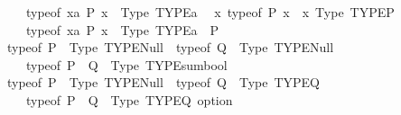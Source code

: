 \begin{isabellebody}
\ \ \ \ \ typeof\ {\isacharparenleft}{\kern0pt}{\isasymexists}x{\isacharcolon}{\kern0pt}{\isacharcolon}{\kern0pt}{\isacharprime}{\kern0pt}a{\isachardot}{\kern0pt}\ P\ x{\isacharparenright}{\kern0pt}\ {\isasymequiv}\ Type\ {\isacharparenleft}{\kern0pt}TYPE{\isacharparenleft}{\kern0pt}{\isacharprime}{\kern0pt}a{\isacharparenright}{\kern0pt}{\isacharparenright}{\kern0pt}{\isachardoublequoteclose}\isanewline
\isanewline
\ \ {\isachardoublequoteopen}{\isacharparenleft}{\kern0pt}{\isasymlambda}x{\isachardot}{\kern0pt}\ typeof\ {\isacharparenleft}{\kern0pt}P\ x{\isacharparenright}{\kern0pt}{\isacharparenright}{\kern0pt}\ {\isasymequiv}\ {\isacharparenleft}{\kern0pt}{\isasymlambda}x{\isachardot}{\kern0pt}\ Type\ {\isacharparenleft}{\kern0pt}TYPE{\isacharparenleft}{\kern0pt}{\isacharprime}{\kern0pt}P{\isacharparenright}{\kern0pt}{\isacharparenright}{\kern0pt}{\isacharparenright}{\kern0pt}\ {\isasymLongrightarrow}\isanewline
\ \ \ \ \ typeof\ {\isacharparenleft}{\kern0pt}{\isasymexists}x{\isacharcolon}{\kern0pt}{\isacharcolon}{\kern0pt}{\isacharprime}{\kern0pt}a{\isachardot}{\kern0pt}\ P\ x{\isacharparenright}{\kern0pt}\ {\isasymequiv}\ Type\ {\isacharparenleft}{\kern0pt}TYPE{\isacharparenleft}{\kern0pt}{\isacharprime}{\kern0pt}a\ {\isasymtimes}\ {\isacharprime}{\kern0pt}P{\isacharparenright}{\kern0pt}{\isacharparenright}{\kern0pt}{\isachardoublequoteclose}\isanewline
\isanewline
\ \ {\isachardoublequoteopen}typeof\ P\ {\isasymequiv}\ Type\ {\isacharparenleft}{\kern0pt}TYPE{\isacharparenleft}{\kern0pt}Null{\isacharparenright}{\kern0pt}{\isacharparenright}{\kern0pt}\ {\isasymLongrightarrow}\ typeof\ Q\ {\isasymequiv}\ Type\ {\isacharparenleft}{\kern0pt}TYPE{\isacharparenleft}{\kern0pt}Null{\isacharparenright}{\kern0pt}{\isacharparenright}{\kern0pt}\ {\isasymLongrightarrow}\isanewline
\ \ \ \ \ typeof\ {\isacharparenleft}{\kern0pt}P\ {\isasymor}\ Q{\isacharparenright}{\kern0pt}\ {\isasymequiv}\ Type\ {\isacharparenleft}{\kern0pt}TYPE{\isacharparenleft}{\kern0pt}sumbool{\isacharparenright}{\kern0pt}{\isacharparenright}{\kern0pt}{\isachardoublequoteclose}\isanewline
\isanewline
\ \ {\isachardoublequoteopen}typeof\ P\ {\isasymequiv}\ Type\ {\isacharparenleft}{\kern0pt}TYPE{\isacharparenleft}{\kern0pt}Null{\isacharparenright}{\kern0pt}{\isacharparenright}{\kern0pt}\ {\isasymLongrightarrow}\ typeof\ Q\ {\isasymequiv}\ Type\ {\isacharparenleft}{\kern0pt}TYPE{\isacharparenleft}{\kern0pt}{\isacharprime}{\kern0pt}Q{\isacharparenright}{\kern0pt}{\isacharparenright}{\kern0pt}\ {\isasymLongrightarrow}\isanewline
\ \ \ \ \ typeof\ {\isacharparenleft}{\kern0pt}P\ {\isasymor}\ Q{\isacharparenright}{\kern0pt}\ {\isasymequiv}\ Type\ {\isacharparenleft}{\kern0pt}TYPE{\isacharparenleft}{\kern0pt}{\isacharprime}{\kern0pt}Q\ option{\isacharparenright}{\kern0pt}{\isacharparenright}{\kern0pt}{\isachardoublequoteclose}\isanewline

\end{isabellebody}
